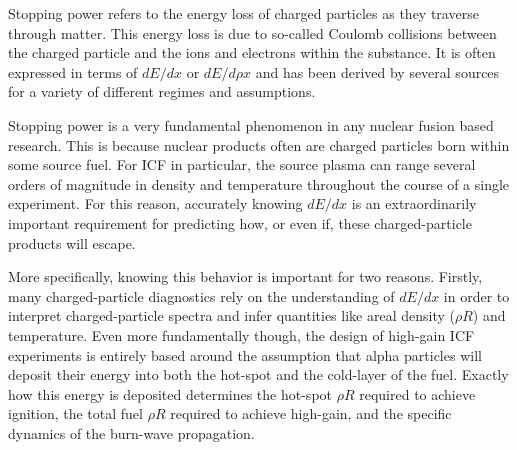Stopping power refers to the energy loss of charged particles as they traverse through matter. This energy loss is due to so-called Coulomb collisions between the charged particle and the ions and electrons within the substance. It is often expressed in terms of $dE/dx$ or $dE/d\rho x$ and has been derived by several sources for a variety of different regimes and assumptions.

Stopping power is a very fundamental phenomenon in any nuclear fusion based research. This is because nuclear products often are charged particles born within some source fuel. For ICF in particular, the source plasma can range several orders of magnitude in density and temperature throughout the course of a single experiment. For this reason, accurately knowing $dE/dx$ is an extraordinarily important requirement for predicting how, or even if, these charged-particle products will escape.

More specifically, knowing this behavior is important for two reasons. Firstly, many charged-particle diagnostics rely on the understanding of $dE/dx$ in order to interpret charged-particle spectra and infer quantities like areal density ($\rho R$) and temperature. Even more fundamentally though, the design of high-gain ICF experiments is entirely based around the assumption that alpha particles will deposit their energy into both the hot-spot and the cold-layer of the fuel. Exactly how this energy is deposited determines the hot-spot $\rho R$ required to achieve ignition, the total fuel $\rho R$ required to achieve high-gain, and the specific dynamics of the burn-wave propagation.